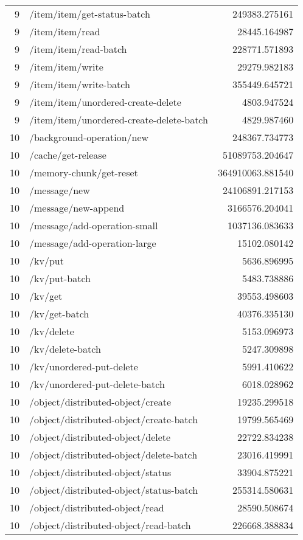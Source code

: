 \begin{longtable}{rlr}
9 & /item/item/get-status-batch & 249383.275161 \\
9 & /item/item/read & 28445.164987 \\
9 & /item/item/read-batch & 228771.571893 \\
9 & /item/item/write & 29279.982183 \\
9 & /item/item/write-batch & 355449.645721 \\
9 & /item/item/unordered-create-delete & 4803.947524 \\
9 & /item/item/unordered-create-delete-batch & 4829.987460 \\
10 & /background-operation/new & 248367.734773 \\
10 & /cache/get-release & 51089753.204647 \\
10 & /memory-chunk/get-reset & 364910063.881540 \\
10 & /message/new & 24106891.217153 \\
10 & /message/new-append & 3166576.204041 \\
10 & /message/add-operation-small & 1037136.083633 \\
10 & /message/add-operation-large & 15102.080142 \\
10 & /kv/put & 5636.896995 \\
10 & /kv/put-batch & 5483.738886 \\
10 & /kv/get & 39553.498603 \\
10 & /kv/get-batch & 40376.335130 \\
10 & /kv/delete & 5153.096973 \\
10 & /kv/delete-batch & 5247.309898 \\
10 & /kv/unordered-put-delete & 5991.410622 \\
10 & /kv/unordered-put-delete-batch & 6018.028962 \\
10 & /object/distributed-object/create & 19235.299518 \\
10 & /object/distributed-object/create-batch & 19799.565469 \\
10 & /object/distributed-object/delete & 22722.834238 \\
10 & /object/distributed-object/delete-batch & 23016.419991 \\
10 & /object/distributed-object/status & 33904.875221 \\
10 & /object/distributed-object/status-batch & 255314.580631 \\
10 & /object/distributed-object/read & 28590.508674 \\
10 & /object/distributed-object/read-batch & 226668.388834 \\

\end{longtable}
